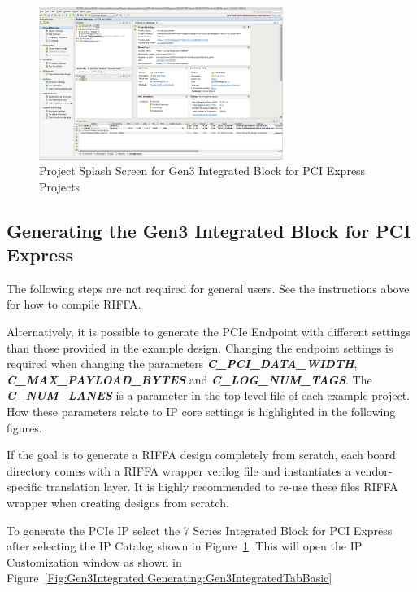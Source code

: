 \documentclass{refrep}
\newcommand{\RIFFAParameter}[1]{\textit{\textbf{#1}}}
\begin{document}
\begin{figure}
  \includegraphics[width=300px,center]{Gen3IntegratedOpenProject.png}
  \caption{Project Splash Screen for Gen3 Integrated Block for PCI Express Projects}
  \label{Fig:Gen3Integrated:ExampleDesign:ProjectOpened}
\end{figure}
\subsection{Generating the Gen3 Integrated Block for PCI Express}
\label{Sec:Gen3Integrated:Generating}
The following steps are not required for general users. See the instructions
above for how to compile RIFFA.

Alternatively, it is possible to generate the PCIe Endpoint with different
settings than those provided in the example design. Changing the endpoint
settings is required when changing the parameters
\RIFFAParameter{C\_PCI\_DATA\_WIDTH}, \RIFFAParameter{C\_MAX\_PAYLOAD\_BYTES}
and \RIFFAParameter{C\_LOG\_NUM\_TAGS}. The \RIFFAParameter{C\_NUM\_LANES} is a
parameter in the top level file of each example project. How these parameters
relate to IP core settings is highlighted in the following figures.

If the goal is to generate a RIFFA design completely from scratch, each board
directory comes with a RIFFA wrapper verilog file and instantiates a
vendor-specific translation layer. It is highly recommended to re-use these
files RIFFA wrapper when creating designs from scratch.

To generate the PCIe IP select the 7 Series Integrated Block for PCI Express
after selecting the IP Catalog shown in
Figure~\ref{Fig:Gen3Integrated:ExampleDesign:ProjectOpened}. This will open the
IP Customization window as shown in
Figure~\ref{Fig:Gen3Integrated:Generating:Gen3IntegratedTabBasic}
\end{document}
